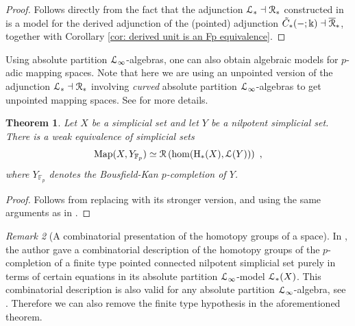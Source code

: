 \documentclass[a4paper,12pt]{amsart}
\renewcommand{\mathcal}{\EuScript}
\theoremstyle{plain}
\newtheorem{theorem}{Theorem}[section]
\theoremstyle{definition}
\theoremstyle{remark}
\newtheorem{remark}[theorem]{\sc Remark}%
\newcommand{\kk}{\Bbbk}
\begin{document}
\begin{proof}
Follows directly from the fact that the adjunction $\mathcal{L}_* \dashv \mathcal{R}_*$ constructed in \cite[Section 2]{lucio2024higherlietheorypositive} is a model for the derived adjunction of the (pointed) adjunction $\tilde{C}_*(-;\kk) \dashv \overline{\mathcal{R}}_*$, together with Corollary \ref{cor: derived unit is an Fp equivalence}. 
\end{proof}

Using absolute partition $\mathcal{L}_\infty$-algebras, one can also obtain algebraic models for $p$-adic mapping spaces. Note that here we are using an unpointed version of the adjunction $\mathcal{L}_* \dashv \mathcal{R}_*$ involving \textit{curved} absolute partition $\mathcal{L}_\infty$-algebras to get unpointed mapping spaces. See \cite{lucio2024higherlietheorypositive} for more details. 

\begin{theorem}
Let $X$ be a simplicial set and let $Y$ be a nilpotent simplicial set. There is a weak equivalence of simplicial sets 
\[
\mathrm{Map}(X, Y_{\mathbb{F}_p}) \simeq \mathcal{R}\left(\mathrm{hom}(\mathrm{H}_*(X), \mathcal{L}(Y))\right)~,
\]
where $Y_{\mathbb{F}_p}$ denotes the Bousfield-Kan $p$-completion of $Y$. 
\end{theorem}

\begin{proof}
Follows from replacing \cite[Corollary 3.7]{lucio2024higherlietheorypositive} with its stronger version, and using the same arguments as in \cite[Corollary 3.28]{lucio2024higherlietheorypositive}. 
\end{proof}

\begin{remark}[A combinatorial presentation of the homotopy groups of a space]
In \cite[Theorem 3.17]{lucio2024higherlietheorypositive}, the author gave a combinatorial description of the homotopy groups of the $p$-completion of a finite type pointed connected nilpotent simplicial set purely in terms of certain equations in its absolute partition $\mathcal{L}_\infty$-model $\mathcal{L}_*(X)$. This combinatorial description is also valid for any absolute partition $\mathcal{L}_\infty$-algebra, see \cite[Theorem B]{lucio2024higherlietheorypositive}. Therefore we can also remove the finite type hypothesis in the aforementioned theorem. 
\end{remark}

\vspace{1pc}
\renewcommand{\thesection}{A}
\end{document}
